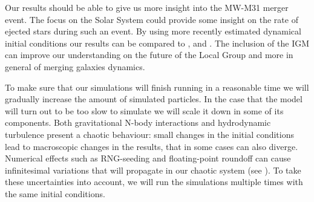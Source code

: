 \documentclass[10pt,english]{article}
\begin{document}
\smallskip
Our results should be able to give us more insight into the MW-M31 merger event. The focus on the Solar System could provide some insight on the rate of ejected stars during such an event. By using more recently estimated dynamical initial conditions our results can be compared to \textcite{Cox_2008}, \textcite{van_der_Marel_2012b} and \textcite{Schiavi_2019}. The inclusion of the IGM can improve our understanding on the future of the Local Group and more in general of merging galaxies dynamics.\par
\smallskip
To make sure that our simulations will finish running in a reasonable time we will gradually increase the amount of simulated particles. In the case that the model will turn out to be too slow to simulate we will scale it down in some of its components. Both gravitational N-body interactions and hydrodynamic turbulence present a chaotic behaviour: small changes in the initial conditions lead to macroscopic changes in the results, that in some cases can also diverge. Numerical effects such as RNG-seeding and floating-point roundoff can cause infinitesimal variations that will propagate in our chaotic system (see \textcite{Keller_2018}). To take these uncertainties into account, we will run the simulations multiple times with the same initial conditions.\par
\smallskip
\end{document}
